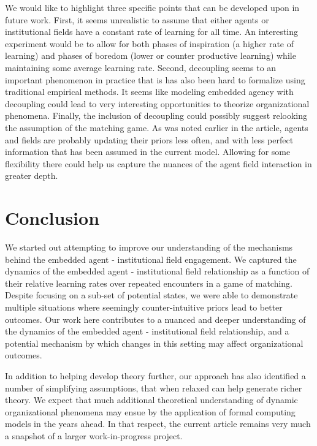 \documentclass[12pt,letterpaper]{article}
\begin{document}
We would like to highlight three specific points that can be developed upon in future work. First, it seems unrealistic to assume that either agents or institutional fields have a constant rate of learning for all time. An interesting experiment would be to allow for both phases of inspiration (a higher rate of learning) and phases of boredom (lower or counter productive learning) while maintaining some average learning rate. Second, decoupling seems to an important phenomenon in practice that is has also been hard to formalize using traditional empirical methods. It seems like modeling embedded agency with decoupling could lead to very interesting opportunities to theorize organizational phenomena. Finally, the inclusion of decoupling could possibly suggest relooking the assumption of the matching game. As was noted earlier in the article, agents and fields are probably updating their priors less often, and with less perfect information that has been assumed in the current model. Allowing for some flexibility there could help us capture the nuances of the agent field interaction in greater depth.

\section{Conclusion}
We started out attempting to improve our understanding of the mechanisms behind the embedded agent - institutional field engagement. We captured the dynamics of the embedded agent - institutional field relationship as a function of their relative learning rates over repeated encounters in a game of matching. Despite focusing on a sub-set of potential states, we were able to demonstrate multiple situations where seemingly counter-intuitive priors lead to better outcomes. Our work here contributes to a nuanced and deeper understanding of the dynamics of the embedded agent - institutional field relationship, and a potential mechanism by  which changes in this setting may affect organizational outcomes.  

In addition to helping develop theory further, our approach has also identified a number of simplifying assumptions, that when relaxed can help generate richer theory. We expect that much additional theoretical understanding of dynamic organizational phenomena may ensue by the application of formal computing models in the years ahead. In that respect, the current article remains very much a snapshot of a larger work-in-progress project.

\end{document}
